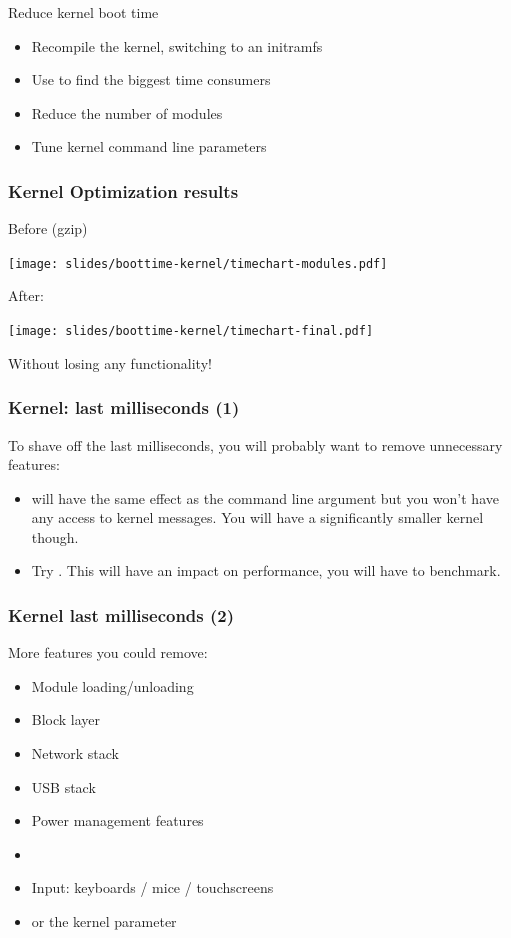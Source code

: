 \setuplabframe
{Reduce kernel boot time}
{
\begin{itemize}
\item Recompile the kernel, switching to an initramfs
\item Use  to find the biggest
      time consumers
\item Reduce the number of modules
\item Tune kernel command line parameters
\end{itemize}
}

\begin{frame}
\frametitle{Kernel Optimization results}
Before (gzip)
\begin{center}
    \texttt{[image: slides/boottime-kernel/timechart-modules.pdf]}
\end{center}
After:
\begin{center}
    \texttt{[image: slides/boottime-kernel/timechart-final.pdf]}
\end{center}
Without losing any functionality!
\end{frame}

\begin{frame}
\frametitle{Kernel: last milliseconds (1)}
To shave off the last milliseconds, you will probably want to remove
unnecessary features:
\begin{itemize}
        \item {} will have the same effect as the
               command line argument but you won't have
	      any access to kernel messages. You will have a
              significantly smaller kernel though.
        \item Try . This will have
              an impact on performance, you will have to benchmark.
\end{itemize}
\end{frame}

\begin{frame}
\frametitle{Kernel last milliseconds (2)}
More features you could remove:
\begin{itemize}
        \item Module loading/unloading
        \item Block layer
        \item Network stack
        \item USB stack
        \item Power management features
        \item {}
        \item Input: keyboards / mice / touchscreens
        \item {} or the
               kernel parameter
\end{itemize}
\end{frame}

